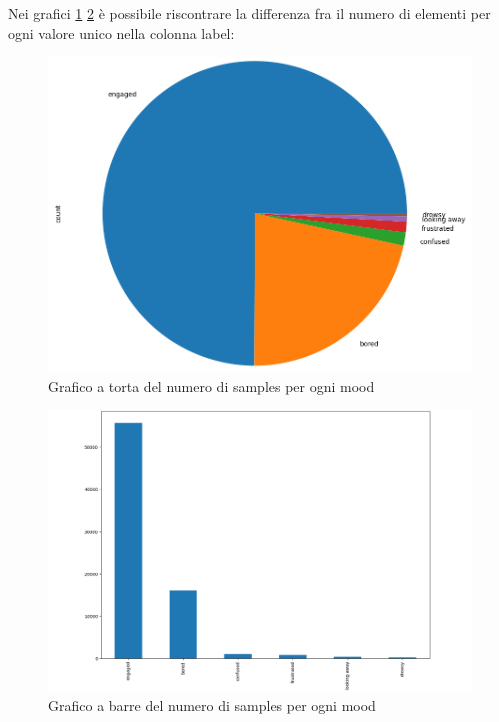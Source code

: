 Nei grafici \ref{fig:image9} \ref{fig:image10} è possibile riscontrare la differenza fra il numero di elementi per ogni valore unico nella colonna label:
\begin{figure}
    \begin{center}    
        \includegraphics[width=0.75\linewidth]{images/image43.png}
        \caption{Grafico a torta del numero di samples per ogni mood}
        \label{fig:image9}
    \end{center}
\end{figure}
\begin{figure}
    \begin{center}    
        \includegraphics[width=0.75\linewidth]{images/image44.png}
        \caption{Grafico a barre del numero di samples per ogni mood}
        \label{fig:image10}
    \end{center}
\end{figure}

